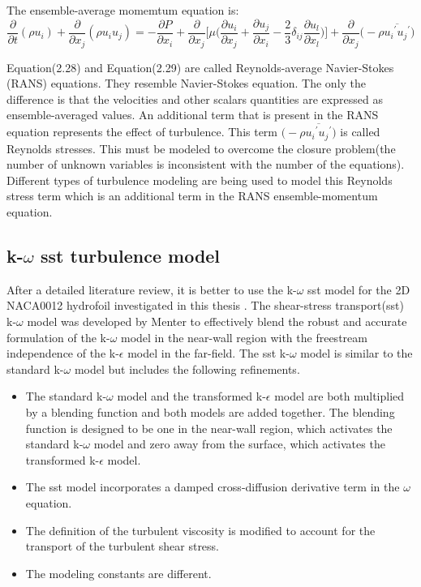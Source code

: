 The ensemble-average momemtum equation is:
\begin{equation}
{{{\frac{\partial}{\partial t}}(\rho u_i)}+{{\frac{\partial}{\partial
        x_j}}(\rho{u_i}{u_j})}}={-{\frac{\partial P}{\partial
      x_i}}+{\frac{\partial}{\partial
      x_j}}{\Bigg[{\mu}\Bigg({{{\frac{\partial u_i} {\partial
              x_j}}+{\frac{\partial u_j}{\partial
              x_i}}-{\frac{2}{3}}{{\delta}_{ij}}{\frac{\partial
              u_l}{\partial
              x_l}}}}\Bigg)\Bigg]+{\frac{\partial}{\partial
        x_j}}\bigg({-}{\rho}{\overline{{{u_i}^\prime}{{u_j}^\prime}}}\bigg)}}
\end{equation}

Equation(2.28) and Equation(2.29) are called Reynolds-average
Navier-Stokes (RANS) equations. They resemble Navier-Stokes
equation. The only the difference is that the velocities and other scalars
quantities are expressed as ensemble-averaged values. An additional
term that is present in the RANS equation represents the effect of
turbulence. This term
$\bigg({-}{\rho}{\overline{{{u_i}^\prime}{{u_j}^\prime}}}\bigg)$ is
called Reynolds stresses. This must be modeled to overcome the closure
problem(the number of unknown variables is inconsistent with the
number of the equations). Different types of turbulence modeling are
being used to model this Reynolds stress term which is an additional
term in the RANS ensemble-momentum equation.

\subsection{k-$\omega$ sst turbulence model}
After a detailed literature review, it is better to use the k-$\omega$
sst model for the 2D NACA0012 hydrofoil investigated in this thesis \cite{Zhao2021,ANSYS}. The
shear-stress transport(sst) k-$\omega$ model was developed by Menter
to effectively blend the robust and accurate formulation of the
k-$\omega$ model in the near-wall region with the freestream independence
of the k-$\epsilon$ model in the far-field. The sst k-$\omega$ model
is similar to the standard k-$\omega$ model but includes the following
refinements.

\begin{itemize}
\item The standard k-$\omega$ model and the transformed k-$\epsilon$
  model are both multiplied by a blending function and both models are
  added together. The blending function is designed to be one in the
  near-wall region, which activates the standard k-$\omega$ model and
  zero away from the surface, which activates the transformed
  k-$\epsilon$ model.
\item The sst model incorporates a damped cross-diffusion derivative
  term in the $\omega$ equation.
\item The definition of the turbulent viscosity is modified to account
  for the transport of the turbulent shear stress.
\item The modeling constants are different.
\end{itemize}

